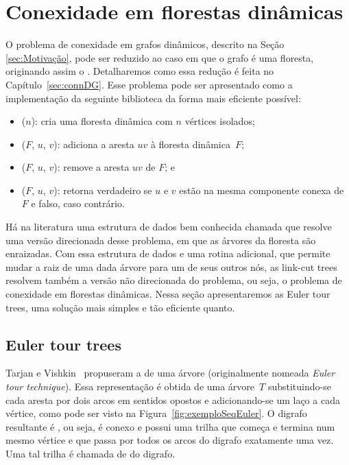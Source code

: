 \chapter{Conexidade em florestas dinâmicas}
\label{sec:connDF}

O problema de conexidade em grafos dinâmicos, descrito na Seção \ref{sec:Motivação}, pode ser reduzido ao caso em que o grafo é uma floresta, originando assim o . Detalharemos como essa redução é feita no Capítulo~\ref{sec:connDG}. Esse problema pode ser apresentado como a implementação da seguinte biblioteca da forma mais eficiente possível: 

\begin{itemize}
\item \dymForestCreate($n$): cria uma floresta dinâmica com $n$ vértices isolados;
\item \dymForestAddEdge($F$, $u$, $v$): adiciona a aresta $uv$ à floresta dinâmica~$F$;
\item \dymForestDelEdge($F$, $u$, $v$): remove a aresta $uv$ de $F$; e
\item \dymForestQuery($F$, $u$, $v$): retorna verdadeiro se $u$ e $v$ estão na mesma componente conexa de $F$ e falso, caso contrário.
\end{itemize}
 
Há na literatura uma estrutura de dados bem conhecida chamada  \cite{SleatroTarjanLinkCutTree1983} que resolve uma versão direcionada desse problema, em que as árvores da floresta são enraizadas.
Com essa estrutura de dados e uma rotina adicional, que permite mudar a raiz de uma dada árvore para um de seus outros nós, as link-cut trees resolvem também a versão não direcionada do problema, ou seja, o problema de conexidade em florestas dinâmicas.
Nessa seção apresentaremos as Euler tour trees, uma solução mais simples e tão eficiente quanto.


\section{Euler tour trees} 

Tarjan e Vishkin~\cite{tarjan1985} propuseram a  de uma árvore (originalmente nomeada \textit{Euler tour technique}).
Essa representação é obtida de uma árvore~$T$ substituindo-se cada aresta por dois arcos em sentidos opostos e adicionando-se um laço a cada vértice, como pode ser visto na Figura~\ref{fig:exemploSeqEuler}. O digrafo resultante é , ou seja, é conexo e possui uma trilha que começa e termina num mesmo vértice e que passa por todos os arcos do digrafo exatamente uma vez. Uma tal trilha é chamada de  do digrafo.


